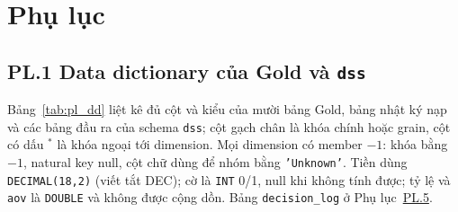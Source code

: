 \documentclass[a4paper]{article}
\begin{document}
\newpage
{}
{}
\section*{Phụ lục}

\label{pl:1}
\subsection*{PL.1 Data dictionary của Gold và \texttt{dss}}

Bảng~\ref{tab:pl_dd} liệt kê đủ cột và kiểu của mười bảng Gold, bảng nhật ký nạp và các bảng đầu ra của schema \texttt{dss}; cột gạch chân là khóa chính hoặc grain, cột có dấu $^{*}$ là khóa ngoại tới dimension. Mọi dimension có member $-1$: khóa bằng $-1$, natural key null, cột chữ dùng để nhóm bằng \texttt{'Unknown'}. Tiền dùng \texttt{DECIMAL(18,2)} (viết tắt DEC); cờ là \texttt{INT} 0/1, null khi không tính được; tỷ lệ và \texttt{aov} là \texttt{DOUBLE} và không được cộng dồn. Bảng \texttt{decision\_\allowbreak{}log} ở Phụ lục~\hyperref[pl:5]{PL.5}.
\end{document}
